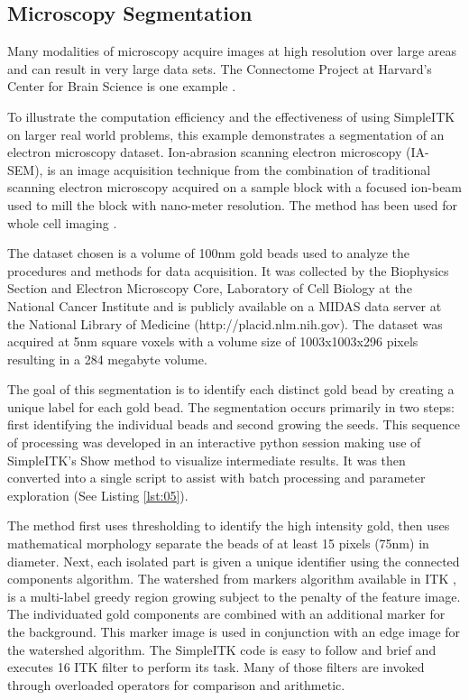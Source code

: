 \documentclass{frontiersMED} %
\begin{document}
\subsection{Microscopy Segmentation}
Many modalities of microscopy acquire images at high resolution over
large areas and can result in very large data sets. The Connectome Project at
Harvard's Center for Brain Science is one example \cite{Seyedhosseini2011}.

To illustrate the computation efficiency and the effectiveness of
using SimpleITK on larger real world problems, this example
demonstrates a segmentation of an electron microscopy
dataset. Ion-abrasion scanning electron microscopy (IA-SEM), is an
image acquisition technique from the combination of traditional
scanning electron microscopy acquired on a sample block with a focused
ion-beam used to mill the block with nano-meter resolution. The method
has been used for whole cell imaging \cite{Murphy2011}.

The dataset chosen is a volume of 100nm gold beads used to analyze the
procedures and methods for data acquisition. It was collected by the
Biophysics Section and Electron Microscopy Core, Laboratory of Cell
Biology at the National Cancer Institute and is publicly available on
a MIDAS data server at the National Library of Medicine
(http://placid.nlm.nih.gov). The dataset was acquired at 5nm square
voxels with a volume size of 1003x1003x296 pixels resulting in a 284
megabyte volume.

The goal of this segmentation is to identify each distinct gold bead
by creating a unique label for each gold bead. The segmentation occurs
primarily in two steps: first identifying the individual beads and
second growing the seeds. This sequence of
processing was developed in an interactive python session making use
of SimpleITK's Show method to visualize intermediate results. It was
then converted into a single script to assist with batch processing
and parameter exploration (See Listing \ref{lst:05}).



The method first uses thresholding to identify the high intensity gold,
then uses mathematical morphology separate the beads of at least 15 pixels
(75nm) in diameter. Next, each isolated part is given a unique
identifier using the connected components algorithm. The watershed from
markers algorithm available in ITK \cite{Beare2006}, is
a multi-label greedy region growing subject to the penalty of the
feature image. The individuated gold components are combined with an
additional marker for the background. This marker image is used in
conjunction with an edge image for the watershed algorithm. The
SimpleITK code is easy to follow and brief and executes 16 ITK filter
to perform its task. Many of those filters are invoked through
overloaded operators for comparison and arithmetic.
\end{document}
